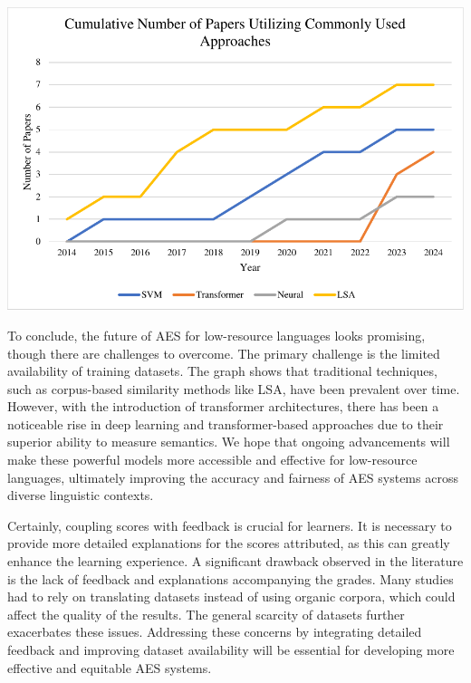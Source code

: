 \documentclass{article}
\begin{document}
	\includegraphics{img/paperstrend.pdf}
	
	To conclude, the future of AES for low-resource languages looks promising, though there are challenges to overcome. The primary challenge is the limited availability of training datasets. The graph shows that traditional techniques, such as corpus-based similarity methods like LSA, have been prevalent over time. However, with the introduction of transformer architectures, there has been a noticeable rise in deep learning and transformer-based approaches due to their superior ability to measure semantics. We hope that ongoing advancements will make these powerful models more accessible and effective for low-resource languages, ultimately improving the accuracy and fairness of AES systems across diverse linguistic contexts.
	
	Certainly, coupling scores with feedback is crucial for learners. It is necessary to provide more detailed explanations for the scores attributed, as this can greatly enhance the learning experience. A significant drawback observed in the literature is the lack of feedback and explanations accompanying the grades. Many studies had to rely on translating datasets instead of using organic corpora, which could affect the quality of the results. The general scarcity of datasets further exacerbates these issues. Addressing these concerns by integrating detailed feedback and improving dataset availability will be essential for developing more effective and equitable AES systems.
	
	\printbibliography
\end{document}
